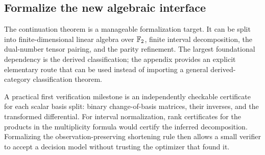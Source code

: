 \subsection{Formalize the new algebraic interface}
The continuation theorem is a manageable formalization target. It can be
split into finite-dimensional linear algebra over $\mathbb F_2$, finite interval
decomposition, the dual-number tensor pairing, and the parity refinement.
The largest foundational dependency is the derived classification; the
appendix provides an explicit elementary route that can be used instead of
importing a general derived-category classification theorem.

A practical first verification milestone is an independently checkable
certificate for each scalar basis split: binary change-of-basis matrices,
their inverses, and the transformed differential. For interval normalization,
rank certificates for the products in the multiplicity formula would certify
the inferred decomposition. Formalizing the observation-preserving shortening
rule then allows a small verifier to accept a decision model without trusting
the optimizer that found it.
